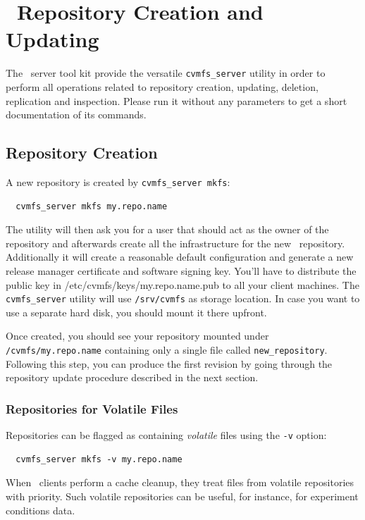 \section{\cvmfs\ Repository Creation and Updating}
\label{sct:repocreateandupdate}
The \cvmfs\ server tool kit provide the versatile \texttt{cvmfs\_server} utility in order to perform all operations related to repository creation, updating, deletion, replication and inspection.
Please run it without any parameters to get a short documentation of its commands.

\subsection{Repository Creation}
\label{sct:repocreation}

A new repository is created by \texttt{cvmfs\_server mkfs}:
\begin{verbatim}
  cvmfs_server mkfs my.repo.name
\end{verbatim}
The utility will then ask you for a user that should act as the owner of the repository and afterwards create all the infrastructure for the new \cvmfs\ repository.
Additionally it will create a reasonable default configuration and generate a new release manager certificate and software signing key. 
You'll have to distribute the public key in /etc/cvmfs/keys/my.repo.name.pub to all your client machines.
The \texttt{cvmfs\_server} utility will use \texttt{/srv/cvmfs} as storage location.
In case you want to use a separate hard disk, you should mount it there upfront.

Once created, you should see your repository mounted under \texttt{/cvmfs/my.repo.name} containing only a single file called \texttt{new\_repository}.
Following this step, you can produce the first revision by going through the repository update procedure described in the next section.

\subsubsection{Repositories for Volatile Files}
Repositories can be flagged as containing \emph{volatile} files using the \texttt{-v} option:
\begin{verbatim}
  cvmfs_server mkfs -v my.repo.name
\end{verbatim}
When \cvmfs\ clients perform a cache cleanup, they treat files from volatile repositories with priority.
Such volatile repositories can be useful, for instance, for experiment conditions data.

